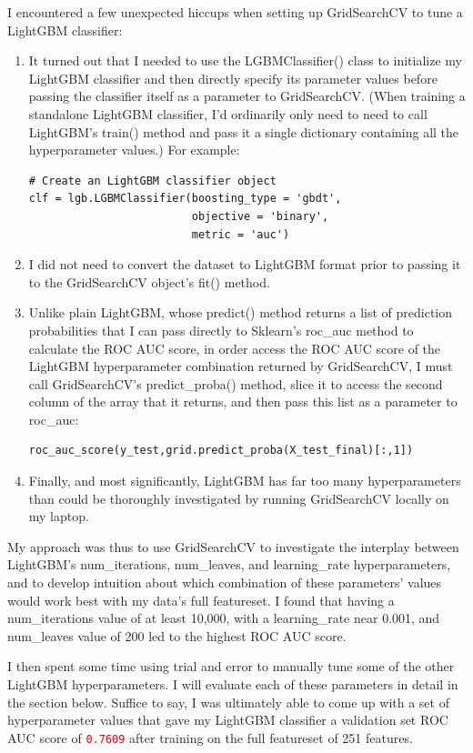 \documentclass[12pt, letterpaper]{article}
\begin{document}
I encountered a few unexpected hiccups when setting up GridSearchCV to tune a LightGBM classifier:
\begin{enumerate}
  \item It turned out that I needed to use the LGBMClassifier() class to initialize my LightGBM classifier and then directly specify its parameter values before passing the classifier itself as a parameter to GridSearchCV. (When training a standalone LightGBM classifier, I'd ordinarily only need to need to call LightGBM's train() method and pass it a single dictionary containing all the hyperparameter values.) For example:
  \begin{lstlisting}
# Create an LightGBM classifier object
clf = lgb.LGBMClassifier(boosting_type = 'gbdt',
                         objective = 'binary',
                         metric = 'auc')
  \end{lstlisting}
  \item I did not need to convert the dataset to LightGBM format prior to passing it to the GridSearchCV object's fit() method.
  \item Unlike plain LightGBM, whose predict() method returns a list
  of prediction probabilities that I can pass directly to Sklearn's roc_auc method to calculate the ROC AUC score, in order access the ROC AUC score of the LightGBM hyperparameter combination returned by GridSearchCV, I must call GridSearchCV's predict_proba() method, slice it to access the second column of the array that it returns, and then pass this list as a parameter to roc_auc:
  \begin{lstlisting}
roc_auc_score(y_test,grid.predict_proba(X_test_final)[:,1])
  \end{lstlisting}
  \item Finally, and most significantly, LightGBM has far too many hyperparameters than could be thoroughly investigated by running GridSearchCV locally on my laptop.
\end{enumerate}

My approach was thus to use GridSearchCV to investigate the interplay between LightGBM's num_iterations, num_leaves, and learning_rate hyperparameters, and to develop intuition about which combination of these parameters' values would work best with my data's full featureset. I found that having a num_iterations value of at least 10,000, with a learning_rate near 0.001, and num_leaves value of 200 led to the highest ROC AUC score.

I then spent some time using trial and error to manually tune some of the other LightGBM hyperparameters. I will evaluate each of these parameters in detail in the section below. Suffice to say, I was ultimately able to come up with a set of hyperparameter values that gave my LightGBM classifier a validation set ROC AUC score of \colorbox{backcolor}{\textcolor{red}{\texttt{0.7609}}} after training on the full featureset of 251 features.
\end{document}

